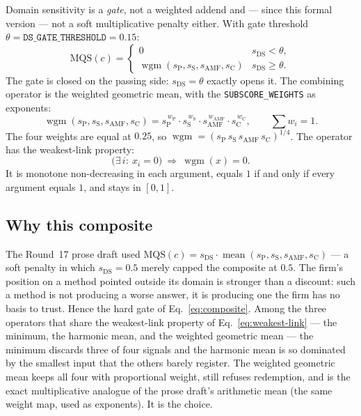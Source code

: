 \documentclass[11pt]{article}
\newcommand{\sP}{s_{\mathrm{P}}}
\newcommand{\sS}{s_{\mathrm{S}}}
\newcommand{\sAMF}{s_{\mathrm{AMF}}}
\newcommand{\sC}{s_{\mathrm{C}}}
\newcommand{\sDS}{s_{\mathrm{DS}}}
\newcommand{\code}[1]{\texttt{#1}}
\begin{document}
Domain sensitivity is a \emph{gate}, not a weighted addend and --- since this
formal version --- not a soft multiplicative penalty either. With gate
threshold $\theta = \texttt{DS\_GATE\_THRESHOLD} = 0.15$:
\begin{equation}
\label{eq:composite}
\mathrm{MQS}(c) =
\begin{cases}
0 & \sDS < \theta,\\[3pt]
\operatorname{wgm}(\sP, \sS, \sAMF, \sC) & \sDS \ge \theta.
\end{cases}
\end{equation}
The gate is closed on the passing side: $\sDS = \theta$ exactly opens it. The
combining operator is the weighted geometric mean, with the
\code{SUBSCORE\_WEIGHTS} as exponents:
\begin{equation}
\label{eq:wgm}
\operatorname{wgm}(\sP, \sS, \sAMF, \sC)
 = \sP^{\,w_{\mathrm{P}}}\cdot \sS^{\,w_{\mathrm{S}}}\cdot \sAMF^{\,w_{\mathrm{AMF}}}\cdot \sC^{\,w_{\mathrm{C}}},
\qquad \sum w_i = 1.
\end{equation}
The four weights are equal at $0.25$, so $\operatorname{wgm} = (\sP\, \sS\,
\sAMF\, \sC)^{1/4}$. The operator has the weakest-link property:
\begin{equation}
\label{eq:weakest-link}
\bigl(\exists\, i:\ x_i = 0\bigr) \ \Longrightarrow\ \operatorname{wgm}(x) = 0.
\end{equation}
It is monotone non-decreasing in each argument, equals $1$ if and only if every
argument equals $1$, and stays in $[0,1]$.

\subsection{Why this composite}

The Round~17 prose draft used $\mathrm{MQS}(c) = \sDS \cdot
\operatorname{mean}(\sP, \sS, \sAMF, \sC)$ --- a soft penalty in which
$\sDS = 0.5$ merely capped the composite at $0.5$. The firm's position on a
method pointed outside its domain is stronger than a discount: such a method
is not producing a worse answer, it is producing one the firm has no basis to
trust. Hence the hard gate of Eq.~\eqref{eq:composite}. Among the three
operators that share the weakest-link property of
Eq.~\eqref{eq:weakest-link} --- the minimum, the harmonic mean, and the
weighted geometric mean --- the minimum discards three of four signals and the
harmonic mean is so dominated by the smallest input that the others barely
register. The weighted geometric mean keeps all four with proportional weight,
still refuses redemption, and is the exact multiplicative analogue of the
prose draft's arithmetic mean (the same weight map, used as exponents). It is
the choice.
\end{document}
